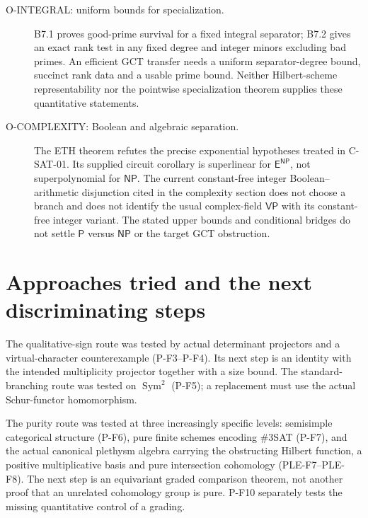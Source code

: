 \begin{description}
\item[O-INTEGRAL: uniform bounds for specialization.]
B7.1 proves good-prime survival for a fixed integral separator; B7.2 gives
an exact rank test in any fixed degree and integer minors excluding bad
primes. An efficient GCT transfer needs a uniform separator-degree bound,
succinct rank data and a usable prime bound. Neither Hilbert-scheme
representability nor the pointwise specialization theorem supplies these
quantitative statements.

\item[O-COMPLEXITY: Boolean and algebraic separation.]
The ETH theorem refutes the precise exponential hypotheses treated in
C-SAT-01. Its supplied circuit corollary is superlinear for
$\mathsf E^{\mathsf{NP}}$, not superpolynomial for $\mathsf{NP}$.
The current constant-free integer Boolean--arithmetic disjunction cited
in the complexity section does not choose a branch and does not identify
the usual complex-field $\mathsf{VP}$ with its constant-free integer
variant. The stated upper bounds and conditional bridges do not settle
$\mathsf P$ versus $\mathsf{NP}$ or the target GCT obstruction.
\end{description}

\section{Approaches tried and the next discriminating steps}
The qualitative-sign route was tested by actual determinant projectors
and a virtual-character counterexample (P-F3--P-F4). Its next step is an
identity with the intended multiplicity projector together with a size
bound. The standard-branching route was tested on $\operatorname{Sym}^2$
(P-F5); a replacement must use the actual Schur-functor homomorphism.

The purity route was tested at three increasingly specific levels:
semisimple categorical structure (P-F6), pure finite schemes encoding
\#3SAT (P-F7), and the actual canonical plethysm algebra carrying the
obstructing Hilbert function, a positive multiplicative basis and pure
intersection cohomology (PLE-F7--PLE-F8). The next step is an
equivariant graded comparison theorem, not another proof that an unrelated
cohomology group is pure. P-F10 separately tests the missing quantitative
control of a grading.


